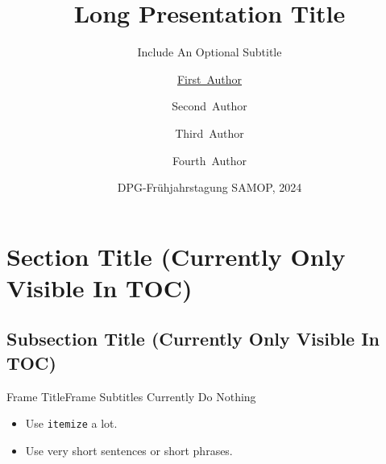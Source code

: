 \documentclass[aspectratio=1610]{beamer}
\title[Short Title]%
{Long Presentation Title}
\subtitle
{Include An Optional Subtitle}
\author[F.~Author] %
{\underline{First~Author}\inst{1} \and Second~Author\inst{1} \and Third~Author\inst{2} \and Fourth~Author\inst{2}}
\institute[Uni Kassel] %
{
  \inst{1}%
  Institute of Physics and CINSaT\\
  University of Kassel
  \and
  \inst{2}%
  Department of Something\\
  University of Somewhere}
\date[DPG 2024] %
{DPG-Frühjahrstagung SAMOP, 2024}
\begin{document}
\begin{frame}
  \titlepage
\end{frame}






\section{Section Title (Currently Only Visible In TOC)}

\subsection{Subsection Title (Currently Only Visible In TOC)}

\begin{frame}{Frame Title}{Frame Subtitles Currently Do Nothing}
  \begin{itemize}
    \item Use \texttt{itemize} a lot.
    \item Use very short sentences or short phrases.
  \end{itemize}
\end{frame}
\end{document}

